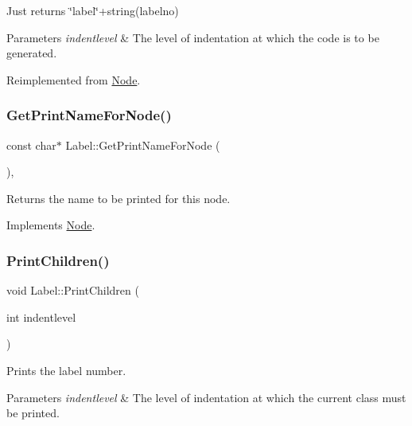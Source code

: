 Just returns \char`\"{}label\char`\"{}+string(labelno) 
\begin{DoxyParams}{Parameters}
{\em indentlevel} & The level of indentation at which the code is to be generated. \\
\hline
\end{DoxyParams}


Reimplemented from \hyperlink{class_node_acb60e526730e8436056375a3055c2c32}{Node}.

\mbox{\label{class_label_a25ab9ad9a76ebf3011623a12925a8c2f}} 
\subsubsection{\texorpdfstring{Get\+Print\+Name\+For\+Node()}{GetPrintNameForNode()}}
{\footnotesize\ttfamily const char$\ast$ Label\+::\+Get\+Print\+Name\+For\+Node (\begin{DoxyParamCaption}{ }\end{DoxyParamCaption})\hspace{0.3cm}{\ttfamily [inline]}, {\ttfamily [virtual]}}

Returns the name to be printed for this node. 

Implements \hyperlink{class_node_a56e29657306ffb004d69c6929ae44269}{Node}.

\mbox{\label{class_label_a7a7e823044ba97369dfe7cf5e860a4cd}} 
\subsubsection{\texorpdfstring{Print\+Children()}{PrintChildren()}}
{\footnotesize\ttfamily void Label\+::\+Print\+Children (\begin{DoxyParamCaption}\item[{int}]{indentlevel }\end{DoxyParamCaption})\hspace{0.3cm}{\ttfamily [virtual]}}

Prints the label number. 
\begin{DoxyParams}{Parameters}
{\em indentlevel} & The level of indentation at which the current class must be printed. \\
\hline
\end{DoxyParams}


